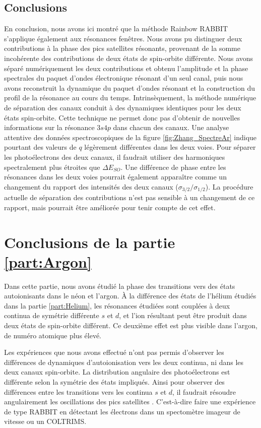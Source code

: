 \subsection{Conclusions}
En conclusion, nous avons ici montré que la méthode Rainbow RABBIT s'applique également aux résonances fenêtres. Nous avons pu distinguer deux contributions à la phase des pics satellites résonants, provenant de la somme incohérente des contributions de deux états de spin-orbite différente. Nous avons séparé numériquement les deux contributions et obtenu l'amplitude et la phase spectrales du paquet d'ondes électronique résonant d'un seul canal, puis nous avons reconstruit la dynamique du paquet d'ondes résonant et la construction du profil de la résonance au cours du temps. Intrinsèquement, la méthode numérique de séparation des canaux conduit à des dynamiques identiques pour les deux états spin-orbite. Cette technique ne permet donc pas d'obtenir de nouvelles informations sur la résonance $3s4p$ dans chacun des canaux. Une analyse attentive des données spectroscopiques de la figure \ref{fig:Zhang_SpectreAr} indique pourtant des valeurs de $q$ légèrement différentes dans les deux voies. Pour séparer les photoélectrons des deux canaux, il faudrait utiliser des harmoniques spectralement plus étroites que $\Delta E_{SO}$. Une différence de phase entre les résonances dans les deux voies pourrait également apparaître comme un changement du rapport des intensités des deux canaux ($\sigma_{3/2}/\sigma_{1/2}$). La procédure actuelle de séparation des contributions n'est pas sensible à un changement de ce rapport, mais pourrait être améliorée pour tenir compte de cet effet.

\section*{Conclusions de la partie \ref{part:Argon}}
Dans cette partie, nous avons étudié la phase des transitions vers des états autoionisants dans le néon et l'argon. \`{A} la différence des états de l'hélium étudiés dans la partie \ref{part:Helium}, les résonances étudiées sont couplées à deux continua de symétrie différente $s$ et $d$, et l'ion résultant peut être produit dans deux états de spin-orbite différent. Ce deuxième effet est plus visible dans l'argon, de numéro atomique plus élevé.

Les expériences que nous avons effectué n'ont pas permis d'observer les différences de dynamiques d'autoionisation vers les deux continua, ni dans les deux canaux spin-orbite. La distribution angulaire des photoélectrons est différente selon la symétrie des états impliqués. Ainsi pour observer des différences entre les transitions vers les continua $s$ et $d$, il faudrait résoudre angulairement les oscillations des pics satellites . C'est-à-dire faire une expérience de type RABBIT en détectant les électrons dans un spectomètre imageur de vitesse  ou un COLTRIMS.

